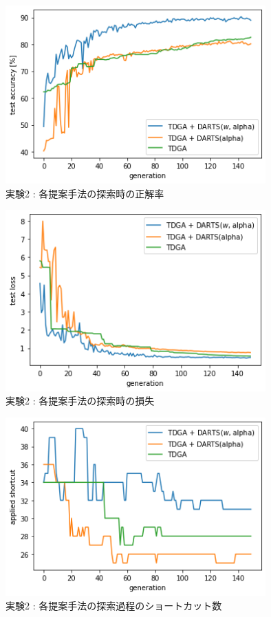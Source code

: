 \begin{figure}[t]
  \begin{center}
    \includegraphics[clip,width=10cm]{./fig/04.exp/acc.png}
  \end{center}
  \caption{実験2 : 各提案手法の探索時の正解率}
  \label{fig:exp2/acc}
\end{figure}
\begin{figure}[t]
  \begin{center}
    \includegraphics[clip,width=10cm]{./fig/04.exp/loss.png}
  \end{center}
  \caption{実験2 : 各提案手法の探索時の損失}
  \label{fig:exp2/loss}
\end{figure}
\begin{figure}[t]
  \begin{center}
    \includegraphics[clip,width=10cm]{./fig/04.exp/edge.png}
  \end{center}
  \caption{実験2 : 各提案手法の探索過程のショートカット数}
  \label{fig:exp2/edge}
\end{figure}

